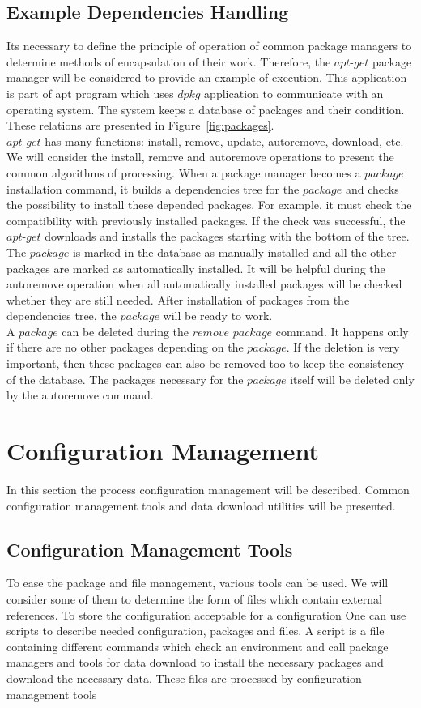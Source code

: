 \subsection*{Example Dependencies Handling}
Its necessary to define the principle of operation of common package managers to determine methods of encapsulation of their work.
Therefore, the $apt$-$get$ package manager will be considered to provide an example of execution.
This application is part of \gls{apt} program which uses $dpkg$ application to communicate with an operating system.
The system keeps a database of packages and their condition.
These relations are presented in Figure~\ref{fig:packages}.\\
$apt$-$get$ has many functions: install, remove, update, autoremove, download, etc.
We will consider the install, remove and autoremove operations to present the common algorithms of processing.
When a package manager becomes a $package$ installation command, it builds a dependencies tree for the $package$ and checks the possibility to install these depended packages.
For example, it must check the compatibility with previously installed packages. 
If the check was successful, the $apt$-$get$ downloads and installs the packages starting with the bottom of the tree.
The $package$ is marked in the database as manually installed and all the other packages are marked as automatically installed. 
It will be helpful during the autoremove operation when all automatically installed packages will be checked whether they are still needed.
After installation of packages from the dependencies tree, the $package$ will be ready to work.\\
A $package$ can be deleted during the $remove$ $package$ command.
It happens only if there are no other packages depending on the $package$. 
If the deletion is very important, then these packages can also be removed too to keep the consistency of the database. 
The packages necessary for the $package$ itself will be deleted only by the autoremove command.

\section{Configuration Management}
In this section the process configuration management will be described. 
Common configuration management tools and data download utilities will be presented.\\
\subsection{Configuration Management Tools}
To ease the package and file management, various tools can be used. 
We will consider some of them to determine the form of files which contain external references. %
To store the configuration acceptable for a configuration
One can use scripts to describe needed configuration, packages and files.
A script is a file containing different commands which check an environment and call package managers and tools for data download to install the necessary packages and download the necessary data.
These files are processed by configuration management tools 

